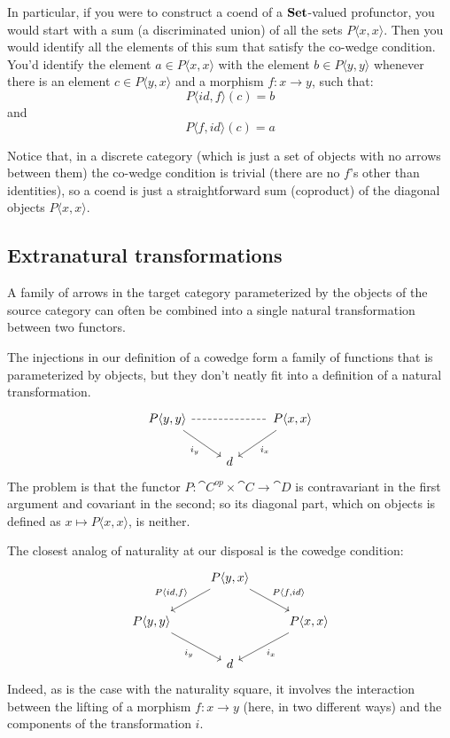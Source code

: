 \documentclass[DaoFP]{subfiles}
\begin{document}
In particular, if you were to construct a coend of a $\mathbf{Set}$-valued profunctor, you would start with a sum (a discriminated union) of all the sets $P \langle x, x \rangle$. Then you would identify all the elements of this sum that satisfy the co-wedge condition. You'd identify the element $a \in P \langle x, x \rangle$ with the element $b \in P \langle y, y \rangle$ whenever there is an element $c  \in P \langle y, x \rangle$ and a morphism $f \colon x \to y$, such that:
\[ P \langle id, f \rangle (c) = b\]
and
\[ P \langle f, id \rangle (c) = a\]

Notice that, in a discrete category (which is just a set of objects with no arrows between them) the co-wedge condition is trivial (there are no $f$'s other than identities), so a coend is just a straightforward sum (coproduct) of the diagonal objects $P \langle x, x \rangle$.

\subsection{Extranatural transformations}

A family of arrows in the target category parameterized by the objects of the source category can often be combined into a single natural transformation between two functors. 

The injections in our definition of a cowedge form a family of functions that is parameterized by objects, but they don't neatly fit into a definition of a natural transformation.
\[
 \begin{tikzcd}
 P \langle y, y \rangle
 \arrow[dr, "i_y"']
 \arrow[rr, dash, dashed]
 &&P \langle x, x \rangle
 \arrow[dl, "i_x"]
 \\
 &d
 \end{tikzcd}
\]
The problem is that the functor $P \colon \cat C^{op} \times \cat C \to \cat D$ is contravariant in the first argument and covariant in the second; so its diagonal part, which on objects is defined as $x \mapsto P \langle x, x \rangle$, is neither.

The closest analog of naturality at our disposal is the cowedge condition:
\[
 \begin{tikzcd}
 &P \langle y, x \rangle
 \arrow[ld, "{P \langle id, f \rangle}"']
 \arrow[rd, "{P \langle f, id \rangle}"]
 \\
 P \langle y, y \rangle
 \arrow[dr, "i_y"']
 &&P \langle x, x \rangle
 \arrow[dl, "i_x"]
 \\
 &d
 \end{tikzcd}
\]
Indeed, as is the case with the naturality square, it involves the interaction between the lifting of a morphism $f \colon x \to y$ (here, in two different ways) and the components of the transformation $i$. 
\end{document}
